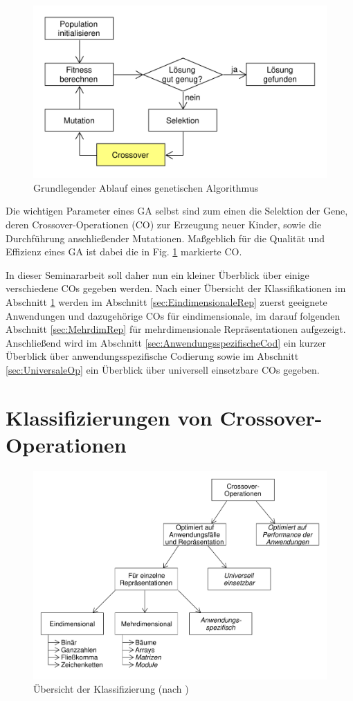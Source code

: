 \documentclass{llncs}
\begin{document}
	\begin{figure}
		\centering
		\includegraphics[width=.8\columnwidth]{./Figures/GA-Prinzip.pdf}
		\caption{Grundlegender Ablauf eines genetischen Algorithmus}
		\label{fig:abb1}
	\end{figure}	

	Die wichtigen Parameter eines GA selbst sind zum einen die Selektion der Gene, deren Crossover-Operationen (CO) zur Erzeugung neuer Kinder, sowie die Durch\-füh\-rung anschließender Mutationen. Maßgeblich für die Qualität und Effizienz eines GA ist dabei die in Fig. \ref{fig:abb1} markierte CO.
	
	In dieser Seminararbeit soll daher nun ein kleiner Überblick über einige verschiedene COs gegeben werden. Nach einer Übersicht der Klassifikationen im Abschnitt \ref{sec:KlassifizierungCrossover} werden im Abschnitt \ref{sec:EindimensionaleRep} zuerst geeignete Anwendungen und dazugehörige COs für eindimensionale, im darauf folgenden Abschnitt \ref{sec:MehrdimRep} für mehrdimensionale Repräsentationen aufgezeigt. Anschließend wird im Abschnitt \ref{sec:AnwendungsspezifischeCod} ein kurzer Überblick über anwendungsspezifische Codierung sowie im Abschnitt \ref{sec:UniversaleOp} ein Überblick über universell einsetzbare COs gegeben.

\section{Klassifizierungen von Crossover-Operationen}
\label{sec:KlassifizierungCrossover}

	\begin{figure}
		\centering
		\includegraphics[width=.8\columnwidth]{./Figures/Crossover-Klassifizierung.pdf}
		\caption{Übersicht der Klassifizierung (nach \cite{Survey})}
		\label{fig:abb2}
	\end{figure}
\end{document}
